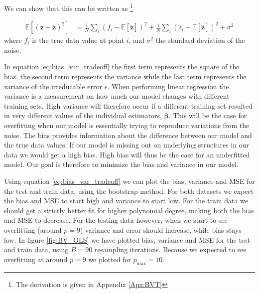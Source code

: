 \documentclass[reprint,english,notitlepage,aps,nobalancelastpage,nofootinbib]{revtex4-1}  %
\newcommand{\expz}{\mathbb{E}[\mathbf{\tilde{z}}]}
\begin{document}
We can show that this can be written as \footnote{The derivation is given in Appendix \ref{Apx:BVT}}

\begin{align}
\label{eq:bias_var_tradeoff}
  \mathbb{E}[(\mathbf{z}-\mathbf{\tilde{z}})^2] &= \frac{1}{N}\sum_i (f_i - \expz)^2 + \frac{1}{N}\sum_i (\tilde{z}_i - \expz)^2 + \sigma^2
\end{align}
where $f_i$ is the true data value at point $i$, and $\sigma^2$ the standard deviation of the noise.

In equation \eqref{eq:bias_var_tradeoff} the first term represents the square of the bias, the second term represents the variance while the last term represents the variance of the irreducable error $\epsilon$. When performing linear regression the variance is a measurement on how much our model changes with different training sets. High variance will therefore occur if a different training set resulted in very different values of the individual estimators, $\bm{\beta}$. This will be the case for overfitting when our model is essentially trying to reproduce variations from the noise. The bias provides information about the difference between our model and the true data values. If our model is missing out on underlying structures in our data we would get a high bias. High bias will thus be the case for an underfitted model. Our goal is therefore to minimize the bias and variance in our model.

Using equation \eqref{eq:bias_var_tradeoff} we can plot the bias, variance and MSE for the test and train data, using the bootstrap method. For both datasets we expect the bias and MSE to start high and variance to start low. For the train data we should get a strictly better fit for higher polynomial degree, making both the bias and MSE to decrease. For the testing data however, when we start to see overfitting (around $p=9$) variance and error should increase, while bias stays low. In figure \ref{fig:BV_OLS} we have plotted bias, variance and MSE for the test and train data, using $B = 90$ resampling iterations. Because we expected to see overfitting at around $p=9$ we plotted for $p_\text{max} = 10$.
\end{document}
